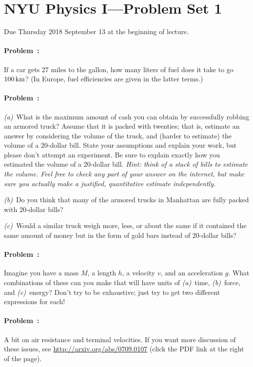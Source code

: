 \documentclass[12pt]{article}
\begin{document}
\section*{NYU Physics I---Problem Set 1}

Due Thursday 2018 September 13 at the beginning of lecture.

\paragraph{Problem~\theproblem:}%
If a car gets 27 miles to the gallon, how many liters of fuel does it
take to go $100\,\mathrm{km}$? (In Europe, fuel efficiencies are given in the
latter terms.)

\paragraph{Problem~\theproblem:}%
\textsl{(a)}~What is the maximum amount of cash you can obtain by
successfully robbing an armored truck?  Assume that it is packed with
twenties; that is, estimate an answer by considering the volume of the
truck, and (harder to estimate) the volume of a 20-dollar bill.  State
your assumptions and explain your work, but please don't attempt an
experiment.  Be sure to explain exactly how you estimated the volume
of a 20-dollar bill.  \emph{Hint: think of a stack of bills to
  estimate the volume.  Feel free to \emph{check} any part of your
  answer on the internet, but make sure you actually make a justified,
  quantitative estimate independently.}

\textsl{(b)}~Do you think that many of the armored trucks in Manhattan
are fully packed with 20-dollar bills?

\textsl{(c)}~Would a similar truck weigh more, less, or about the same
if it contained the same amount of money but in the form of gold bars
instead of 20-dollar bills?

\paragraph{Problem~\theproblem:}%
Imagine you have a mass $M$, a length $h$, a velocity $v$, and an
acceleration $g$. What combinations of these can you make that will
have units of
\textsl{(a)}~time,
\textsl{(b)}~force, and
\textsl{(c)}~energy?
Don't try to be exhaustive; just try to get two different expressions
for each!

\paragraph{Problem~\theproblem:}%
A bit on air resistance and terminal velocities. If you want more
discussion of these issues, see \url{http://arxiv.org/abs/0709.0107}
(click the PDF link at the right of the page).
\end{document}
